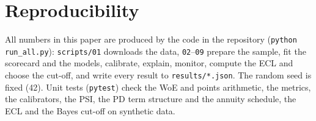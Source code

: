 \documentclass[11pt,a4paper]{article}
\begin{document}



\appendix
\section{Reproducibility}
All numbers in this paper are produced by the code in the repository (\texttt{python run\_all.py}): \texttt{scripts/01} downloads the data, \texttt{02}--\texttt{09} prepare the sample, fit the scorecard and the models, calibrate, explain, monitor, compute the ECL and choose the cut-off, and write every result to \texttt{results/*.json}. The random seed is fixed (42). Unit tests (\texttt{pytest}) check the WoE and points arithmetic, the metrics, the calibrators, the PSI, the PD term structure and the annuity schedule, the ECL and the Bayes cut-off on synthetic data.
\end{document}

